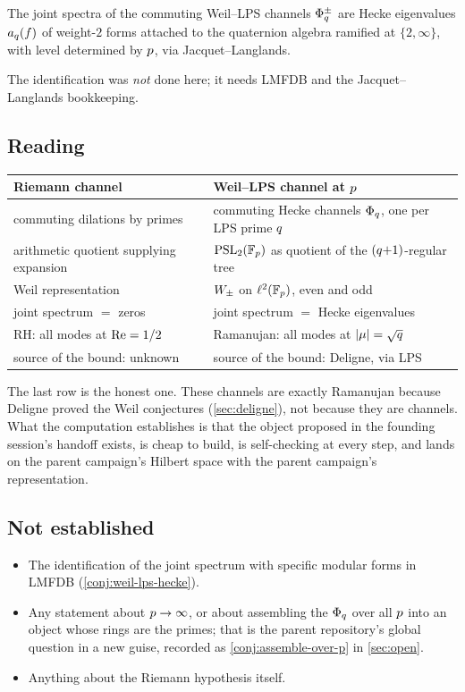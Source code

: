 \begin{conjecture}
\label{conj:weil-lps-hecke}
The joint spectra of the commuting Weil--LPS channels $\Phi_{q}^{\pm}$ are
Hecke eigenvalues $a_{q}(f)$ of weight-$2$ forms attached to the quaternion
algebra ramified at $\{2,\infty\}$, with level determined by $p$, via
Jacquet--Langlands.
\end{conjecture}

The identification was \emph{not} done here; it needs LMFDB and the
Jacquet--Langlands bookkeeping.

\subsection{Reading}

\begin{center}
\begin{tabular}{ll}
\toprule
Riemann channel & Weil--LPS channel at $p$ \\
\midrule
commuting dilations by primes & commuting Hecke channels $\Phi_{q}$, one per LPS prime $q$ \\
arithmetic quotient supplying expansion & $\mathrm{PSL}_2(\mathbb F_p)$ as quotient of the $(q{+}1)$-regular tree \\
Weil representation & $W_{\pm}$ on $\ell^2(\mathbb F_p)$, even and odd \\
joint spectrum $=$ zeros & joint spectrum $=$ Hecke eigenvalues \\
RH: all modes at $\operatorname{Re} = 1/2$ & Ramanujan: all modes at $\lvert\mu\rvert = \sqrt{q}$ \\
source of the bound: unknown & source of the bound: Deligne, via LPS \\
\bottomrule
\end{tabular}
\end{center}

The last row is the honest one. These channels are exactly Ramanujan because
Deligne proved the Weil conjectures (\cref{sec:deligne}), not because they are
channels. What the computation establishes is that the object proposed in the
founding session's handoff exists, is cheap to build, is self-checking at every
step, and lands on the parent campaign's Hilbert space with the parent
campaign's representation.

\subsection{Not established}

\begin{itemize}
  \item The identification of the joint spectrum with specific modular forms
  in LMFDB (\cref{conj:weil-lps-hecke}).
  \item Any statement about $p\to\infty$, or about assembling the
  $\Phi_{q}$ over all $p$ into an object whose rings are the primes; that
  is the parent repository's global question in a new guise, recorded as
  \cref{conj:assemble-over-p} in \cref{sec:open}.
  \item Anything about the Riemann hypothesis itself.
\end{itemize}
